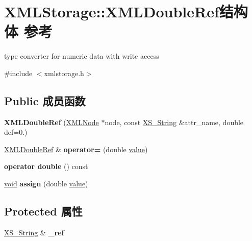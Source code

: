 \hypertarget{struct_x_m_l_storage_1_1_x_m_l_double_ref}{}\section{X\+M\+L\+Storage\+:\+:X\+M\+L\+Double\+Ref结构体 参考}
\label{struct_x_m_l_storage_1_1_x_m_l_double_ref}


type converter for numeric data with write access  




{\ttfamily \#include $<$xmlstorage.\+h$>$}

\subsection*{Public 成员函数}
\begin{DoxyCompactItemize}
\item 
\mbox{\label{struct_x_m_l_storage_1_1_x_m_l_double_ref_affa5a2fb1c7d1052bcdb0574b986c8e5}} 
{\bfseries X\+M\+L\+Double\+Ref} (\hyperlink{struct_x_m_l_storage_1_1_x_m_l_node}{X\+M\+L\+Node} $\ast$node, const \hyperlink{struct_x_m_l_storage_1_1_x_s___string}{X\+S\+\_\+\+String} \&attr\+\_\+name, double def=0.)
\item 
\mbox{\label{struct_x_m_l_storage_1_1_x_m_l_double_ref_a475ededeba0b4392c8d65e63db69b940}} 
\hyperlink{struct_x_m_l_storage_1_1_x_m_l_double_ref}{X\+M\+L\+Double\+Ref} \& {\bfseries operator=} (double \hyperlink{unionvalue}{value})
\item 
\mbox{\label{struct_x_m_l_storage_1_1_x_m_l_double_ref_ae6a994a7142447b13ddb8ac29765de43}} 
{\bfseries operator double} () const
\item 
\mbox{\label{struct_x_m_l_storage_1_1_x_m_l_double_ref_ac42f93550996d40782bd7d8c58b3422d}} 
\hyperlink{interfacevoid}{void} {\bfseries assign} (double \hyperlink{unionvalue}{value})
\end{DoxyCompactItemize}
\subsection*{Protected 属性}
\begin{DoxyCompactItemize}
\item 
\mbox{\label{struct_x_m_l_storage_1_1_x_m_l_double_ref_a4d62ae00ae1b1d2475fcac0df20c91a5}} 
\hyperlink{struct_x_m_l_storage_1_1_x_s___string}{X\+S\+\_\+\+String} \& {\bfseries \+\_\+ref}
\end{DoxyCompactItemize}


